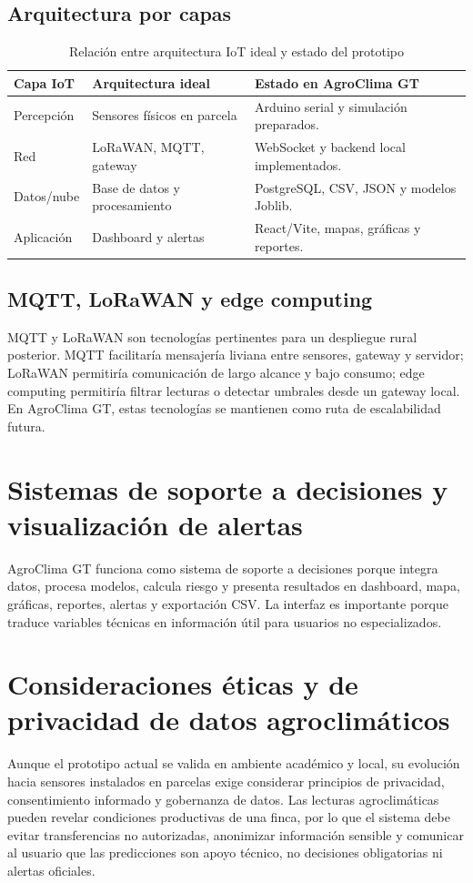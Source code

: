 \documentclass[12pt,letterpaper,oneside]{report}
\begin{document}
\subsection{Arquitectura por capas}
\begin{table}[H]
\centering
\caption{Relación entre arquitectura IoT ideal y estado del prototipo}
\begin{tabularx}{\textwidth}{p{3cm}p{5cm}X}
\toprule
\textbf{Capa IoT} & \textbf{Arquitectura ideal} & \textbf{Estado en AgroClima GT} \\
\midrule
Percepción & Sensores físicos en parcela & Arduino serial y simulación preparados. \\
Red & LoRaWAN, MQTT, gateway & WebSocket y backend local implementados. \\
Datos/nube & Base de datos y procesamiento & PostgreSQL, CSV, JSON y modelos Joblib. \\
Aplicación & Dashboard y alertas & React/Vite, mapas, gráficas y reportes. \\
\bottomrule
\end{tabularx}
\end{table}

\subsection{MQTT, LoRaWAN y edge computing}
MQTT y LoRaWAN son tecnologías pertinentes para un despliegue rural posterior. MQTT facilitaría mensajería liviana entre sensores, gateway y servidor; LoRaWAN permitiría comunicación de largo alcance y bajo consumo; edge computing permitiría filtrar lecturas o detectar umbrales desde un gateway local. En AgroClima GT, estas tecnologías se mantienen como ruta de escalabilidad futura.

\section{Sistemas de soporte a decisiones y visualización de alertas}
AgroClima GT funciona como sistema de soporte a decisiones porque integra datos, procesa modelos, calcula riesgo y presenta resultados en dashboard, mapa, gráficas, reportes, alertas y exportación CSV. La interfaz es importante porque traduce variables técnicas en información útil para usuarios no especializados.

\section{Consideraciones éticas y de privacidad de datos agroclimáticos}
Aunque el prototipo actual se valida en ambiente académico y local, su evolución hacia sensores instalados en parcelas exige considerar principios de privacidad, consentimiento informado y gobernanza de datos. Las lecturas agroclimáticas pueden revelar condiciones productivas de una finca, por lo que el sistema debe evitar transferencias no autorizadas, anonimizar información sensible y comunicar al usuario que las predicciones son apoyo técnico, no decisiones obligatorias ni alertas oficiales.
\end{document}
